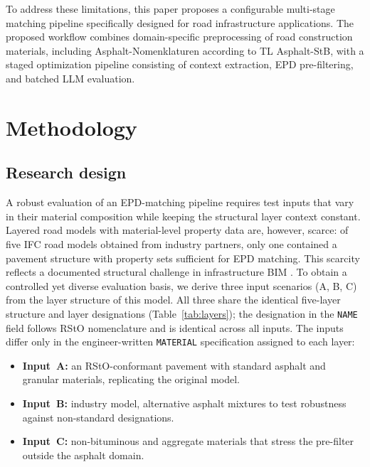\documentclass[10pt, a4paper, twocolumn]{article}
\begin{document}
To address these limitations, this paper proposes a configurable multi-stage matching pipeline specifically designed for road infrastructure applications. The proposed workflow combines domain-specific preprocessing of road construction materials, including Asphalt-Nomenklaturen according to TL Asphalt-StB, with a staged optimization pipeline consisting of context extraction, EPD pre-filtering, and batched LLM evaluation.


\section{Methodology}

\subsection{Research design}

A robust evaluation of an EPD-matching pipeline requires test inputs that vary in
their material composition while keeping the structural layer context constant.
Layered road models with material-level property data are, however, scarce: of
five IFC road models obtained from industry partners, only one contained a
pavement structure with property sets sufficient for EPD matching. This scarcity
reflects a documented structural challenge in infrastructure BIM \cite{Kaus.2025}. 
To obtain a controlled yet diverse evaluation basis, we
derive three input scenarios (A, B, C) from the layer structure of this model.
All three share the identical five-layer structure and layer designations
(Table~\ref{tab:layers}); the designation in the \texttt{NAME} field follows RStO
nomenclature and is identical across all inputs. The inputs differ only in the
engineer-written \texttt{MATERIAL} specification assigned to each layer:

\begin{itemize}[leftmargin=*, itemsep=2pt, topsep=2pt]
  \item \textbf{Input~A:} an RStO-conformant pavement with standard
        asphalt and granular materials, replicating the original model.
  \item \textbf{Input~B:} industry model, alternative asphalt mixtures to test robustness against non-standard designations.
  \item \textbf{Input~C:} non-bituminous and aggregate materials that stress the
        pre-filter outside the asphalt domain.
\end{itemize}
\end{document}

